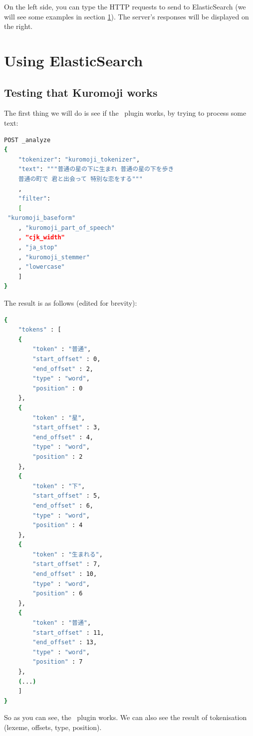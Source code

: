 \bigskip

On the left side, you can type the HTTP requests to send to ElasticSearch (we will see some examples in section \ref{using-elasticsearch}). The server's responses will be displayed on the right.

\newpage



\section{Using ElasticSearch} \label{using-elasticsearch}

\subsection{Testing that Kuromoji works} \label{es-testing-kuromoji}

The first thing we will do is see if the \kuromoji\ plugin works, by trying to process some text: \\

\begin{lstlisting}[language=sh]
POST _analyze
{
	"tokenizer": "kuromoji_tokenizer",
	"text": """普通の星の下に生まれ 普通の星の下を歩き
	普通の町で 君と出会って 特別な恋をする"""
	,
	"filter": 
	[
 "kuromoji_baseform"
	, "kuromoji_part_of_speech"
	, "cjk_width"
	, "ja_stop"
	, "kuromoji_stemmer"
	, "lowercase"
	]
}
\end{lstlisting}


\bigskip

The result is as follows (edited for brevity):

\begin{lstlisting}[language=sh]
{
	"tokens" : [
	{
		"token" : "普通",
		"start_offset" : 0,
		"end_offset" : 2,
		"type" : "word",
		"position" : 0
	},
	{
		"token" : "星",
		"start_offset" : 3,
		"end_offset" : 4,
		"type" : "word",
		"position" : 2
	},
	{
		"token" : "下",
		"start_offset" : 5,
		"end_offset" : 6,
		"type" : "word",
		"position" : 4
	},
	{
		"token" : "生まれる",
		"start_offset" : 7,
		"end_offset" : 10,
		"type" : "word",
		"position" : 6
	},
	{
		"token" : "普通",
		"start_offset" : 11,
		"end_offset" : 13,
		"type" : "word",
		"position" : 7
	},
	(...)
	]
}
\end{lstlisting}

\bigskip

So as you can see, the \kuromoji\ plugin works. We can also see the result of tokenisation (lexeme, offsets, type, position). \\





